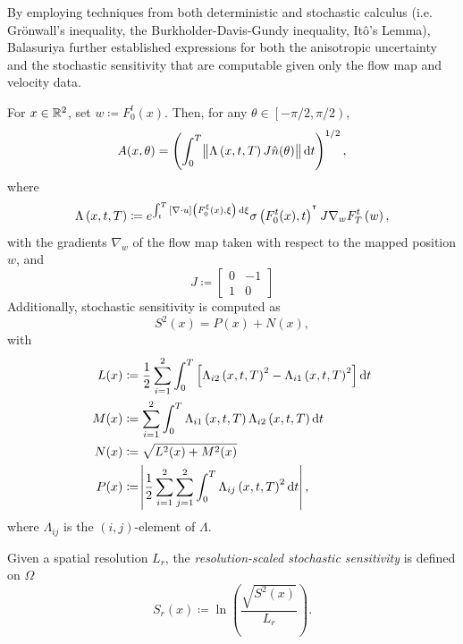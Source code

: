 By employing techniques from both deterministic and stochastic calculus (i.e. Gr\"onwall's inequality, the Burkholder-Davis-Gundy inequality, It\^o's Lemma), Balasuriya further established expressions for both the anisotropic uncertainty and the stochastic sensitivity that are computable given only the flow map and velocity data.

\begin{theorem}\label{thm:orig_s2_calculation}
	For \(x \in \mathbb{R}^2\), set \(w \coloneqq F_0^t(x)\).
	Then, for any \(\theta \in \left[-\pi/2, \pi/2\right)\),
	\[
		A(x,\theta) = \left(\int_0^T{\norm{\Lambda\left(x, t, T\right)J\hat{n}(\theta)}\dif t}\right)^{1/2},
	\]
	where
	\[
		\Lambda\left(x,t,T\right) \coloneqq e^{\int_t^T{\left[\nabla \cdot u\right]\left(F_0^\xi(x), \xi\right)\dif\xi}}\sigma\left(F_0^t(x), t\right)^{\T}J \nabla_w F_T^t\left(w\right),
	\]
	with the gradients \(\nabla_w\) of the flow map taken with respect to the mapped position \(w\), and
	\[
		J \coloneqq \begin{bmatrix}
			0 & -1 \\
			1 & 0
		\end{bmatrix}
	\]
	Additionally, stochastic sensitivity is computed as
	\[
		S^2(x) = P(x) + N(x),
	\]
	with
	\begin{align*}
		L(x) & \coloneqq \frac12\sum_{i=1}^2\int_0^T\left[\Lambda_{i2}\left(x,t, T\right)^2 - \Lambda_{i1}\left(x,t,T\right)^2\right]\dif t \\
		M(x) & \coloneqq \sum_{i=1}^2\int_0^T{\Lambda_{i1}\left(x,t,T\right)\Lambda_{i2}\left(x,t,T\right)\dif t}                           \\
		N(x) & \coloneqq \sqrt{L^2(x) + M^2(x)}                                                                                             \\
		P(x) & \coloneqq \abs{\frac12\sum_{i=1}^2\sum_{j=1}^2{\int_0^T{\Lambda_{ij}\left(x,t,T\right)^2\dif t}}},
	\end{align*}
	where \(\Lambda_{ij}\) is the \((i,j)\)-element of \(\Lambda\).
\end{theorem}



\begin{definition} \label{def:ss_res_scaled}
	Given a spatial resolution \(L_r\), the \emph{resolution-scaled stochastic sensitivity} is defined on \(\Omega\)
	\[
		S_r(x) \coloneqq \ln\left(\frac{\sqrt{S^2(x)}}{L_r}\right).
	\]
\end{definition}




